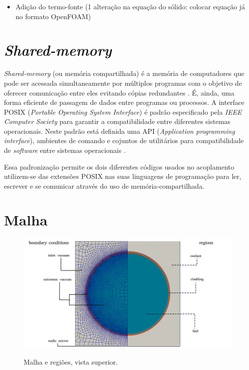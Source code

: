\begin{itemize}
\item Adição do termo-fonte (1 alteração na equação do sólido: colocar equação já no formato OpenFOAM)
\end{itemize}

\section{\textit{Shared-memory}}

\textit{Shared-memory} (ou memória compartilhada) é a memória de computadores que pode ser
acessada simultaneamente por múltiplos programas com o objetivo de oferecer comunicação entre
eles evitando cópias redundantes \cite{Robbins2003}. É, ainda, uma forma eficiente de passagem de dados entre programas
ou processos. A interface POSIX (\textit{Portable Operating System Interface}) é padrão especificado pela
\textit{IEEE Computer Society} para garantir a compatibilidade entre diferentes sistemas operacionais. Neste padrão
está definida uma API (\textit{Application programming interface}), ambientes de comando e cojuntos de utilitários
para compatibilidade de \textit{software} entre sistemas operacionais \cite{Atlidakis2016}.

Essa padronização permite os dois diferentes códigos usados no acoplamento utilizem-se das extensões POSIX nas
suas linguagens de programação para ler, escrever e se comunicar através do uso de memória-compartilhada.






\section{Malha}

\begin{figure}[htb]
  \caption{Malha e regiões, vista superior.}
  \centering\includegraphics[scale=0.5]{figuras/regions_neutronica_malha_e_sem.png}
  \label{regions_malha}
\end{figure}

